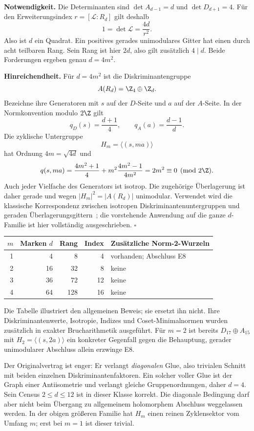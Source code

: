 \textbf{Notwendigkeit.} Die Determinanten sind $\det A_{d-1}=d$ und $\det D_{d+1}=4$. Für den Erweiterungsindex $r=[\mathcal L:R_d]$ gilt deshalb
\[
 1=\det\mathcal L=\frac{4d}{r^2}.
\]
Also ist $d$ ein Quadrat. Ein positives gerades unimodulares Gitter hat einen durch acht teilbaren Rang. Sein Rang ist hier $2d$, also gilt zusätzlich $4\mid d$. Beide Forderungen ergeben genau $d=4m^2$.

\textbf{Hinreichendheit.} Für $d=4m^2$ ist die Diskriminantengruppe
\[
 A(R_d)=\Z_4\oplus\Z_d.
\]
Bezeichne ihre Generatoren mit $s$ auf der $D$-Seite und $a$ auf der $A$-Seite. In der Normkonvention modulo $2\Z$ gilt
\[
 q_D(s)=\frac{d+1}{4},\qquad q_A(a)=\frac{d-1}{d}.
\]
Die zyklische Untergruppe
\[
 H_m=\langle(s,ma)\rangle
\]
hat Ordnung $4m=\sqrt{4d}$ und
\[
 q(s,ma)=\frac{4m^2+1}{4}
       +m^2\frac{4m^2-1}{4m^2}=2m^2\equiv0\pmod{2\Z}.
\]
Auch jeder Vielfache des Generators ist isotrop. Die zugehörige Überlagerung ist daher gerade und wegen $|H_m|^2=|A(R_d)|$ unimodular. Verwendet wird die klassische Korrespondenz zwischen isotropen Diskriminantenuntergruppen und geraden Überlagerungsgittern~\cite{nikulinforms}; die vorstehende Anwendung auf die ganze $d$-Familie ist hier vollständig ausgeschrieben. $\square$

\begin{center}
\begin{tabular}{rrrrl}
\toprule
$m$ & Marken $d$ & Rang & Index & Zusätzliche Norm-2-Wurzeln\\\midrule
1 & 4 & 8 & 4 & vorhanden; Abschluss E8\\
2 & 16 & 32 & 8 & keine\\
3 & 36 & 72 & 12 & keine\\
4 & 64 & 128 & 16 & keine\\\bottomrule
\end{tabular}
\end{center}
Die Tabelle illustriert den allgemeinen Beweis; sie ersetzt ihn nicht. Ihre Diskriminantenwerte, Isotropie, Indizes und Coset-Minimalnormen wurden zusätzlich in exakter Brucharithmetik ausgeführt. Für $m=2$ ist bereits $D_{17}\oplus A_{15}$ mit $H_2=\langle(s,2a)\rangle$ ein konkreter Gegenfall gegen die Behauptung, gerader unimodularer Abschluss allein erzwinge E8.

Der Originalvertrag  ist enger: Er verlangt \emph{diagonalen} Glue, also trivialen Schnitt mit beiden einzelnen Diskriminantenfaktoren. Ein solcher voller Glue ist der Graph einer Antiisometrie und verlangt gleiche Gruppenordnungen, daher $d=4$. Sein Census $2\le d\le12$ ist in dieser Klasse korrekt. Die diagonale Bedingung darf aber nicht beim Übergang zu allgemeinem holomorphem Abschluss weggelassen werden. In der obigen größeren Familie hat $H_m$ einen reinen Zyklensektor vom Umfang $m$; erst bei $m=1$ ist dieser trivial.

